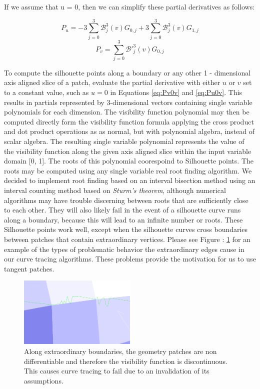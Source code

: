 \documentclass[12pt, letterpaper]{article}
\begin{document}
		If we assume that u = 0, then we can simplify these partial derivatives as follows:

		\begin{equation} \label{eq:Pv0v}
		P_{u} = -3 \sum_{j=0}^{3} \mathcal{B}_{j}^{3}(v) G_{0, j} + 3 \sum_{j=0}^{3} \mathcal{B}_{j}^{3}(v) G_{1, j}
		\end{equation}
		\begin{equation} \label{eq:Pu0v}
		P_{v} = \sum_{j=0}^{3} \mathcal{B'}_{j}^{3} (v) G_{0, j}
		\end{equation}

		To compute the silhouette points along a boundary or any other 1 - dimensional axis aligned slice of a patch, evaluate the partial derivative with either $u$ or $v$ set to a constant value,
		 such as $u = 0$ in Equations \ref{eq:Pv0v} and \ref{eq:Pu0v}. This results in partials represented by 3-dimensional vectors containing single variable polynomials for each dimension.
		The visibility function polynomial may then be computed directly form the visibility function formula applying the cross product and dot product operations as
		as normal, but with polynomial algebra, instead of scalar algebra. The resulting single variable polynomial represents the value of the visibility function 
		along the given axis aligned slice within the input variable domain [0, 1].
		The roots of this polynomial coorespoind to Silhouette points. The roots may be computed using any single variable real root finding algorithm.
		We decided to implement root finding based on an interval bisection method using an interval counting method based on \emph{Sturm's theorem}\cite{AV10}, although numerical algorithms may have trouble discerning between roots that are sufficiently close to each other.
		They will also likely fail in the event of a silhouette curve runs along a boundary, because this will lead to an infinite number or roots.
		These Silhouette points work well, except when the silhouette curves cross boundaries between patches that contain extraordinary vertices.
		Please see Figure : \ref{fig:extraordinary_boundaries} for an example of the types of problematic behavior the extraordinary edges cause in our curve tracing algorithms.
		These problems provide the motivation for us to use tangent patches.

		\begin{figure}[h]
		\centering
		\includegraphics[width=0.5\textwidth]{ill_defined_silhouette_curves_over_extraordinary_boundary}
		\caption{Along extraordinary boundaries, the geometry patches are non differentiable and therefore the visibility function is discontinuous. This causes curve tracing to fail due to an invalidation of its assumptions.}
		\label{fig:extraordinary_boundaries}
		\end{figure}
\end{document}
